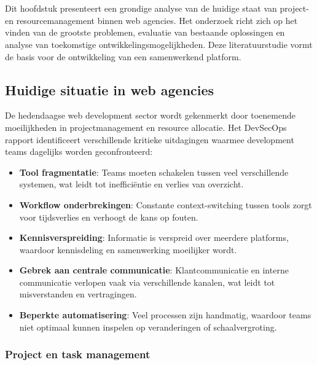 \chapter{}
\label{ch:stand-van-zaken}

Dit hoofdstuk presenteert een grondige analyse van de huidige staat van project- en resourcemanagement binnen web agencies. Het onderzoek richt zich op het vinden van de grootste problemen, evaluatie van bestaande oplossingen en analyse van toekomstige ontwikkelingsmogelijkheden. Deze literatuurstudie vormt de basis voor de ontwikkeling van een samenwerkend platform.

\section{Huidige situatie in web agencies}
\label{sec:huidige-situatie}

De hedendaagse web development sector wordt gekenmerkt door toenemende moeilijkheden in projectmanagement en resource allocatie. Het \textcite{GitLab2023} DevSecOps rapport identificeert verschillende kritieke uitdagingen waarmee development teams dagelijks worden geconfronteerd:

\begin{itemize}
    \item \textbf{Tool fragmentatie}: Teams moeten schakelen tussen veel verschillende systemen, wat leidt tot inefficiëntie en verlies van overzicht.
    \item \textbf{Workflow onderbrekingen}: Constante context-switching tussen tools zorgt voor tijdsverlies en verhoogt de kans op fouten.
    \item \textbf{Kennisverspreiding}: Informatie is verspreid over meerdere platforms, waardoor kennisdeling en samenwerking moeilijker wordt.
    \item \textbf{Gebrek aan centrale communicatie}: Klantcommunicatie en interne communicatie verlopen vaak via verschillende kanalen, wat leidt tot misverstanden en vertragingen.
    \item \textbf{Beperkte automatisering}: Veel processen zijn handmatig, waardoor teams niet optimaal kunnen inspelen op veranderingen of schaalvergroting.
\end{itemize}

\subsection{Project en task management}
\label{subsec:project-management}

